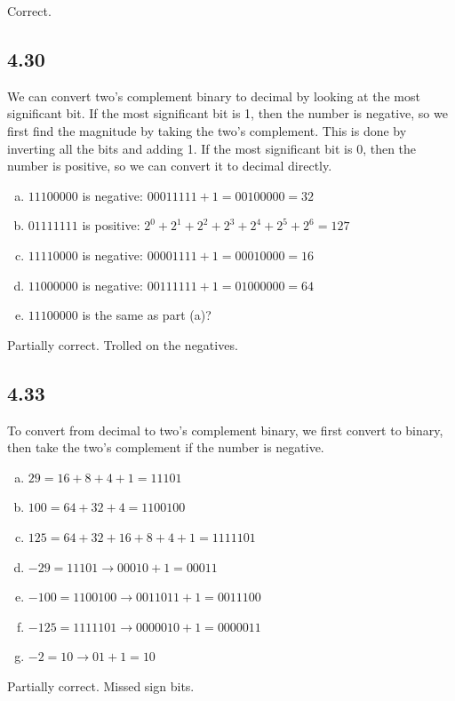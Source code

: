 \documentclass{article}
\begin{document}
\textcolor{mygreen}{Correct.}

\subsection*{4.30}
We can convert two's complement binary to decimal by looking at the most significant bit.
If the most significant bit is 1, then the number is negative, so we first find the magnitude by taking the two's complement.
This is done by inverting all the bits and adding 1.
If the most significant bit is 0, then the number is positive, so we can convert it to decimal directly.
\begin{enumerate}[(a)]
    \item $11100000$ is negative: $00011111 + 1 = 00100000 = 32$
    \item $01111111$ is positive: $2^0 + 2^1 + 2^2 + 2^3 + 2^4 + 2^5 + 2^6 = 127$
    \item $11110000$ is negative: $00001111 + 1 = 00010000 = 16$
    \item $11000000$ is negative: $00111111 + 1 = 01000000 = 64$
    \item $11100000$ is the same as part (a)?
\end{enumerate}

\textcolor{myorange}{Partially correct. Trolled on the negatives.}

\subsection*{4.33}
To convert from decimal to two's complement binary, we first convert to binary, then take the two's complement if the number is negative.
\begin{enumerate}[(a)]
    \item $29 = 16 + 8 + 4 + 1 = 11101$
    \item $100 = 64 + 32 + 4 = 1100100$
    \item $125 = 64 + 32 + 16 + 8 + 4 + 1 = 1111101$
    \item $-29 = 11101 \rightarrow 00010 + 1 = 00011$
    \item $-100 = 1100100 \rightarrow 0011011 + 1 = 0011100$
    \item $-125 = 1111101 \rightarrow 0000010 + 1 = 0000011$
    \item $-2 = 10 \rightarrow 01 + 1 = 10$
\end{enumerate}

\textcolor{myorange}{Partially correct. Missed sign bits.}
\end{document}
